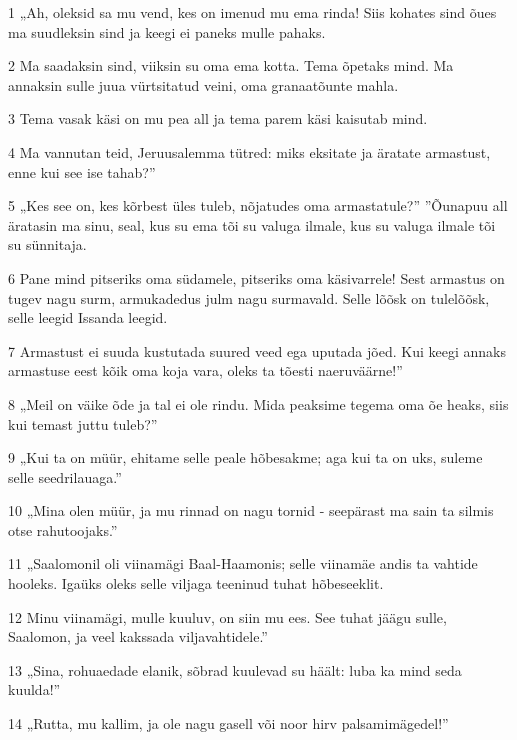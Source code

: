 \par 1 „Ah, oleksid sa mu vend, kes on imenud mu ema rinda! Siis kohates sind õues ma suudleksin sind ja keegi ei paneks mulle pahaks.
\par 2 Ma saadaksin sind, viiksin su oma ema kotta. Tema õpetaks mind. Ma annaksin sulle juua vürtsitatud veini, oma granaatõunte mahla.
\par 3 Tema vasak käsi on mu pea all ja tema parem käsi kaisutab mind.
\par 4 Ma vannutan teid, Jeruusalemma tütred: miks eksitate ja äratate armastust, enne kui see ise tahab?”
\par 5 „Kes see on, kes kõrbest üles tuleb, nõjatudes oma armastatule?” ”Õunapuu all äratasin ma sinu, seal, kus su ema tõi su valuga ilmale, kus su valuga ilmale tõi su sünnitaja.
\par 6 Pane mind pitseriks oma südamele, pitseriks oma käsivarrele! Sest armastus on tugev nagu surm, armukadedus julm nagu surmavald. Selle lõõsk on tulelõõsk, selle leegid Issanda leegid.
\par 7 Armastust ei suuda kustutada suured veed ega uputada jõed. Kui keegi annaks armastuse eest kõik oma koja vara, oleks ta tõesti naeruväärne!”
\par 8 „Meil on väike õde ja tal ei ole rindu. Mida peaksime tegema oma õe heaks, siis kui temast juttu tuleb?”
\par 9 „Kui ta on müür, ehitame selle peale hõbesakme; aga kui ta on uks, suleme selle seedrilauaga.”
\par 10 „Mina olen müür, ja mu rinnad on nagu tornid - seepärast ma sain ta silmis otse rahutoojaks.”
\par 11 „Saalomonil oli viinamägi Baal-Haamonis; selle viinamäe andis ta vahtide hooleks. Igaüks oleks selle viljaga teeninud tuhat hõbeseeklit.
\par 12 Minu viinamägi, mulle kuuluv, on siin mu ees. See tuhat jäägu sulle, Saalomon, ja veel kakssada viljavahtidele.”
\par 13 „Sina, rohuaedade elanik, sõbrad kuulevad su häält: luba ka mind seda kuulda!”
\par 14 „Rutta, mu kallim, ja ole nagu gasell või noor hirv palsamimägedel!”



